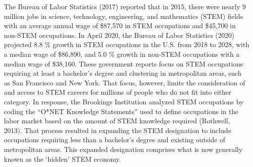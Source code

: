 \documentclass[11pt]{sig-alternate}
\begin{document}
\begin{large}
The Bureau of Labor Statistics (2017) reported that in 2015, there were nearly 9 million jobs in science, technology, engineering, and mathematics (STEM) fields with an average annual wage of \$87,570 in STEM occupations and \$45,700 in non-STEM occupations. In April 2020, the Bureau of Labor Statistics (2020) projected 8.8 \% growth in STEM occupations in the U.S. from 2018 to 2028, with a median wage of \$86,890, and 5.0 \% growth in non-STEM occupations with a median wage of \$38,160. These government reports focus on STEM occupations requiring at least a bachelor’s degree and clustering in metropolitan areas, such as San Francisco and New York. That focus, however, limits the consideration of and access to STEM careers for millions of people who do not fit into either category. In response, the Brookings Institution analyzed STEM occupations by coding the “O*NET Knowledge Statements” used to define occupations in the labor market based on the amount of STEM knowledge required (Rothwell, 2013). That process resulted in expanding the STEM designation to include occupations requiring less than a bachelor’s degree and existing outside of metropolitan areas. This expanded designation comprises what is now generally known as the ‘hidden’ STEM economy. 


\end{large}
\end{document}
